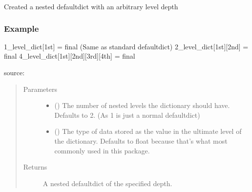 \documentclass[a4paper,10pt,english]{sphinxmanual}
\begin{document}
\begin{fulllineitems}
\label{\detokenize{io_functions:io_functions.nested_dicts}}
Created a nested defaultdict with an arbitrary level depth
\subsubsection*{Example}

1\_level\_dict{[}1st{]} = final (Same as standard defaultdict)
2\_level\_dict{[}1st{]}{[}2nd{]} = final
4\_level\_dict{[}1st{]}{[}2nd{]}{[}3rd{]}{[}4th{]} = final

source: 
\begin{quote}\begin{description}
\item[{Parameters}] \leavevmode\begin{itemize}
\item {} 
 () \textendash{} The number of nested levels the dictionary should have.
Defaults to 2. (As 1 is just a normal defaultdict)

\item {} 
 () \textendash{} The type of data stored as the value in the ultimate
level of the dictionary.
Defaults to float because that’s what most commonly used in
this package.

\end{itemize}

\item[{Returns}] \leavevmode
A nested defaultdict of the specified depth.

\end{description}\end{quote}

\end{fulllineitems}

\end{document}
